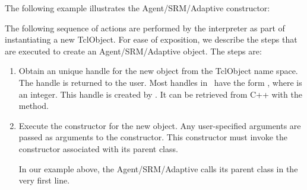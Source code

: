 The following example illustrates the Agent/SRM/Adaptive constructor:

The following sequence of actions are performed by the interpreter
as part of instantiating a new TclObject.
For ease of exposition, we describe the steps that are executed
to create an Agent/SRM/Adaptive object.
The steps are:
\begin{enumerate}
\item
  Obtain an unique handle for the new object   from the TclObject name space.
  The handle is returned to the user.
  Most handles in \ns\ have the form , where 
  is an integer.  This handle is created by
  .
  It can be retrieved from C++ with the
  method.
\item Execute the constructor for the new object.
  Any user-specified arguments are passed as arguments to the constructor.
  This constructor must invoke the constructor
  associated with its parent class.

  In our example above, the Agent/SRM/Adaptive calls its parent class
  in the very first line.  


\end{enumerate}
